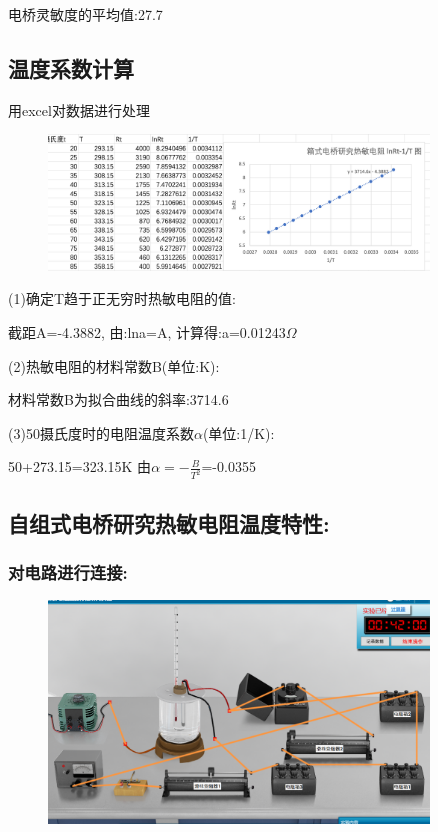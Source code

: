 \documentclass{article}
\begin{document}
电桥灵敏度的平均值:27.7

\subsection*{温度系数计算}
用excel对数据进行处理
\begin{figure}[H]
    \centering
    \includegraphics[width=0.9\textwidth]{5.png}
\end{figure}
(1)确定T趋于正无穷时热敏电阻的值:

截距A=-4.3882, 由:lna=A,  计算得:a=0.01243$\Omega$

(2)热敏电阻的材料常数B(单位:K):

材料常数B为拟合曲线的斜率:3714.6

(3)50摄氏度时的电阻温度系数$\alpha$(单位:1/K):

50+273.15=323.15K
由$\alpha=-\frac{B}{T^{2}}$=-0.0355



\subsection*{自组式电桥研究热敏电阻温度特性:}
\subsubsection*{对电路进行连接:}
\begin{figure}[H]
    \centering
    \includegraphics[width=0.9\textwidth]{虚拟3/5.png}
\end{figure}
\end{document}
